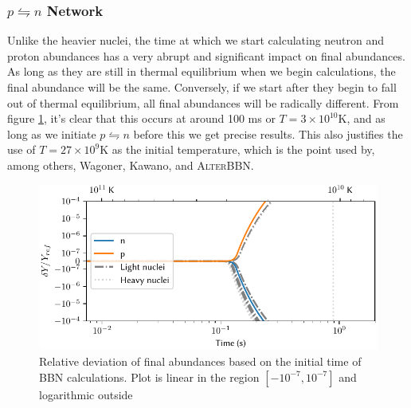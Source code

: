 \subsubsection{$p\leftrightharpoons n$ Network}
Unlike the heavier nuclei, the time at which we start calculating neutron and proton abundances has a very abrupt and significant impact on final abundances. As long as they are still in thermal equilibrium when we begin calculations, the final abundance will be the same. Conversely, if we start after they begin to fall out of thermal equilibrium, all final abundances will be radically different. From figure \ref{fig:npnettime}, it's clear that this occurs at around 100 ms or $T=3\times10^{10}$K, and as long as we initiate $p\leftrightharpoons n$ before this we get precise results. This also justifies the use of $T=27\times10^9$K as the initial temperature, which is the point used by, among others, Wagoner, Kawano, and \textsc{AlterBBN}.
\begin{figure}[ht]
    \includegraphics[width=5.1in]{figures/npnettime.pdf}
    \caption{Relative deviation of final abundances based on the initial time of BBN calculations. Plot is linear in the region $[-10^{-7},10^{-7}]$ and logarithmic outside}
    \label{fig:npnettime}
\end{figure}



